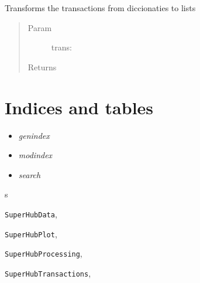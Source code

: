 \documentclass[letterpaper,10pt,english]{sphinxmanual}
\begin{document}

\begin{fulllineitems}
\label{index:SuperHubTransactions.serializeDailyTransactions}
Transforms the transactions from diccionaties to lists
\begin{quote}\begin{description}
\item[{Param }] \leavevmode
trans:

\item[{Returns}] \leavevmode


\end{description}\end{quote}

\end{fulllineitems}



\chapter{Indices and tables}
\label{index:indices-and-tables}\begin{itemize}
\item {} 
\emph{genindex}

\item {} 
\emph{modindex}

\item {} 
\emph{search}

\end{itemize}


\renewcommand{\indexname}{Python Module Index}
\begin{theindex}
\def\bigletter#1{{\Large\sffamily#1}\nopagebreak\vspace{1mm}}
\bigletter{s}
\item {\texttt{SuperHubData}}, \pageref{index:module-SuperHubData}
\item {\texttt{SuperHubPlot}}, \pageref{index:module-SuperHubPlot}
\item {\texttt{SuperHubProcessing}}, \pageref{index:module-SuperHubProcessing}
\item {\texttt{SuperHubTransactions}}, \pageref{index:module-SuperHubTransactions}
\end{theindex}

\renewcommand{\indexname}{Index}
\printindex
\end{document}
